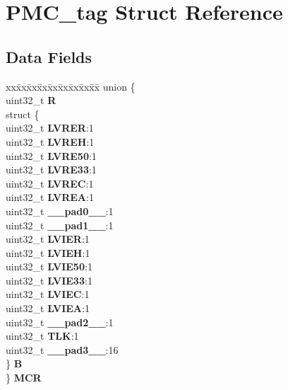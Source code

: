 \hypertarget{structPMC__tag}{}\section{P\+M\+C\+\_\+tag Struct Reference}
\label{structPMC__tag}
\subsection*{Data Fields}
\begin{DoxyCompactItemize}
\item 
\mbox{\label{structPMC__tag_a827af505a995fd95805abd667502ee98}} 
\begin{tabbing}
xx\=xx\=xx\=xx\=xx\=xx\=xx\=xx\=xx\=\kill
union \{\\
\>uint32\_t {\bfseries R}\\
\>struct \{\\
\>\>uint32\_t {\bfseries LVRER}:1\\
\>\>uint32\_t {\bfseries LVREH}:1\\
\>\>uint32\_t {\bfseries LVRE50}:1\\
\>\>uint32\_t {\bfseries LVRE33}:1\\
\>\>uint32\_t {\bfseries LVREC}:1\\
\>\>uint32\_t {\bfseries LVREA}:1\\
\>\>uint32\_t {\bfseries \_\_pad0\_\_}:1\\
\>\>uint32\_t {\bfseries \_\_pad1\_\_}:1\\
\>\>uint32\_t {\bfseries LVIER}:1\\
\>\>uint32\_t {\bfseries LVIEH}:1\\
\>\>uint32\_t {\bfseries LVIE50}:1\\
\>\>uint32\_t {\bfseries LVIE33}:1\\
\>\>uint32\_t {\bfseries LVIEC}:1\\
\>\>uint32\_t {\bfseries LVIEA}:1\\
\>\>uint32\_t {\bfseries \_\_pad2\_\_}:1\\
\>\>uint32\_t {\bfseries TLK}:1\\
\>\>uint32\_t {\bfseries \_\_pad3\_\_}:16\\
\>\} {\bfseries B}\\
\} {\bfseries MCR}\\


\end{tabbing}
\end{DoxyCompactItemize}
